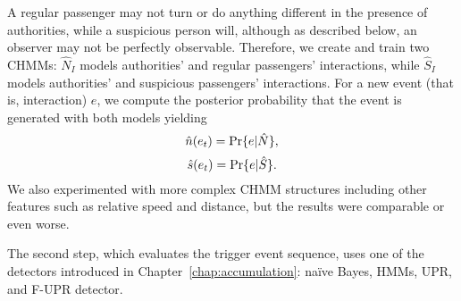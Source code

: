 A regular passenger may not turn or do anything different in the presence of authorities, while a suspicious person will, although as described below, an observer may not be perfectly observable. Therefore, we create and train two CHMMs: $\hat{N}_I$ models authorities' and regular passengers' interactions, while $\hat{S}_I$ models authorities' and suspicious passengers' interactions. For a new event (that is, interaction) $e$, we compute the posterior probability that the event is generated with both models yielding 
\begin{equation}
		\hat{n}(e_t) = \text{Pr}\{e|\hat{N}\},
\label{eq:freq-n}
\end{equation}
\begin{equation}
		\hat{s}(e_t) = \text{Pr}\{e|\hat{S}\}.
\label{eq:freq-n}
\end{equation}
\noindent
We also experimented with more complex CHMM structures including other features such as relative speed and distance, but the results were comparable or even worse. 


The second step, which evaluates the trigger event sequence, uses one of the detectors introduced in Chapter~\ref{chap:accumulation}: na{\"i}ve Bayes, HMMs, UPR, and F-UPR detector.







